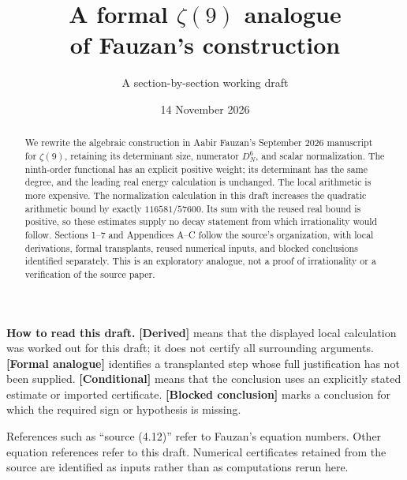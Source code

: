 \documentclass[11pt,letterpaper]{article}
\title{A formal $\zeta(9)$ analogue\\of Fauzan's construction}
\author{A section-by-section working draft}
\date{14 November 2026}
\numberwithin{equation}{section}
\begin{document}
\maketitle
\begin{abstract}
We rewrite the algebraic construction in Aabir Fauzan's September 2026
manuscript for $\zeta(9)$, retaining its determinant size, numerator
$D_N^6$, and scalar normalization. The ninth-order functional has an
explicit positive weight; its determinant has the same degree, and the
leading real energy calculation is unchanged. The local arithmetic is
more expensive. The normalization calculation in this draft increases
the quadratic arithmetic bound by exactly $116581/57600$. Its sum with
the reused real bound is positive, so these estimates supply no decay
statement from which irrationality would follow. Sections 1--7 and
Appendices A--C follow the source's organization, with local derivations,
formal transplants, reused numerical inputs, and blocked conclusions
identified separately. This is an exploratory analogue, not a proof of
irrationality or a verification of the source paper.
\end{abstract}

\smallskip
\noindent\textbf{How to read this draft.}
\textbf{[Derived]} means that the displayed local calculation was worked
out for this draft; it does not certify all surrounding arguments.
\textbf{[Formal analogue]} identifies a transplanted step whose full
justification has not been supplied.
\textbf{[Conditional]} means that the conclusion uses an explicitly
stated estimate or imported certificate.
\textbf{[Blocked conclusion]} marks a conclusion for which the required
sign or hypothesis is missing.

\noindent References such as ``source (4.12)'' refer to Fauzan's equation
numbers. Other equation references refer to this draft. Numerical
certificates retained from the source are identified as inputs rather
than as computations rerun here.

\tableofcontents
\clearpage







\appendix



\clearpage

\end{document}
